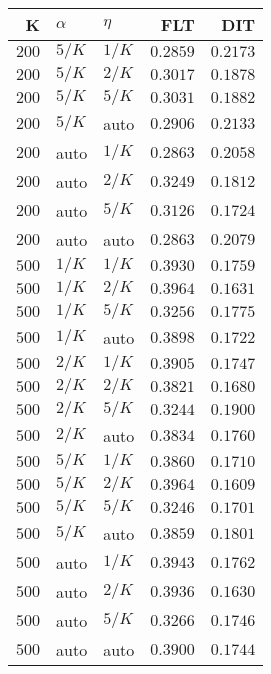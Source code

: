 \begin{table}
\begin{spacing}{1.2}
{\begin{tabular}{rll|rr}
\bottomrule
\end{tabular}
} \hfill \parbox{.45\linewidth}{\centering \begin{tabular}{rll|rr}
\toprule
    K &  $\alpha$ &    $\eta$ &           FLT &           DIT \\
\midrule
$200$ &  $5/K$ &  $1/K$ &      $0.2859$ & $\bm{0.2173}$ \\
$200$ &  $5/K$ &  $2/K$ &      $0.3017$ &      $0.1878$ \\
$200$ &  $5/K$ &  $5/K$ &      $0.3031$ &      $0.1882$ \\
$200$ &  $5/K$ &   auto &      $0.2906$ &      $0.2133$ \\
$200$ &   auto &  $1/K$ &      $0.2863$ &      $0.2058$ \\
$200$ &   auto &  $2/K$ &      $0.3249$ &      $0.1812$ \\
$200$ &   auto &  $5/K$ &      $0.3126$ &      $0.1724$ \\
$200$ &   auto &   auto &      $0.2863$ &      $0.2079$ \\
\myrowcolor $500$ &  $1/K$ &  $1/K$ &      $0.3930$ &      $0.1759$ \\
$500$ &  $1/K$ &  $2/K$ & $\bm{0.3964}$ &      $0.1631$ \\
$500$ &  $1/K$ &  $5/K$ &      $0.3256$ &      $0.1775$ \\
$500$ &  $1/K$ &   auto &      $0.3898$ &      $0.1722$ \\
$500$ &  $2/K$ &  $1/K$ &      $0.3905$ &      $0.1747$ \\
$500$ &  $2/K$ &  $2/K$ &      $0.3821$ &      $0.1680$ \\
$500$ &  $2/K$ &  $5/K$ &      $0.3244$ &      $0.1900$ \\
$500$ &  $2/K$ &   auto &      $0.3834$ &      $0.1760$ \\
$500$ &  $5/K$ &  $1/K$ &      $0.3860$ &      $0.1710$ \\
$500$ &  $5/K$ &  $2/K$ &      $0.3964$ &      $0.1609$ \\
$500$ &  $5/K$ &  $5/K$ &      $0.3246$ &      $0.1701$ \\
$500$ &  $5/K$ &   auto &      $0.3859$ &      $0.1801$ \\
$500$ &   auto &  $1/K$ &      $0.3943$ &      $0.1762$ \\
$500$ &   auto &  $2/K$ &      $0.3936$ &      $0.1630$ \\
$500$ &   auto &  $5/K$ &      $0.3266$ &      $0.1746$ \\
$500$ &   auto &   auto &      $0.3900$ &      $0.1744$ \\
\bottomrule
\end{tabular}
}
\end{spacing}
\end{table}
